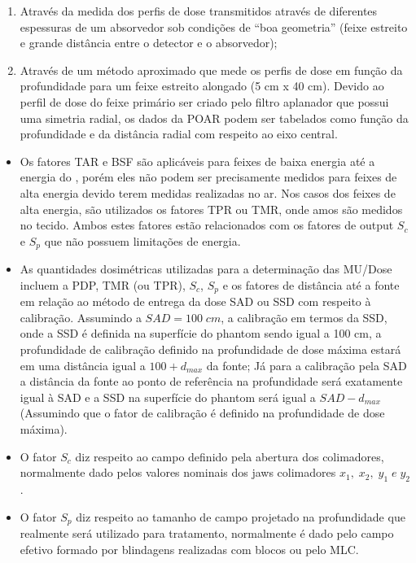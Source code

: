 \documentclass[11pt,a4paper]{article}
\begin{document}
        \begin{enumerate}
            \item Através da medida dos perfis de dose transmitidos através de diferentes espessuras de um absorvedor sob condições de ``boa geometria'' (feixe estreito e grande distância entre o detector e o absorvedor);
            \item Através de um método aproximado que mede os perfis de dose em função da profundidade para um feixe estreito alongado (5 cm x 40 cm). Devido ao perfil de dose do feixe primário ser criado pelo filtro aplanador que possui uma simetria radial, os dados da POAR podem ser tabelados como função da profundidade e da distância radial com respeito ao eixo central.
        \end{enumerate}
    
    \begin{tcolorbox}[width=\textwidth, colback={white}, title={$\bigstar$ \LobsterTwo{Pontos Chave}$\bigstar $}, coltitle={CarnationPink}, colframe={DarkTurquoise}, fonttitle=\LobsterTwo\Large]
    \begin{itemize}[label=\textcolor{CarnationPink}{$\star$}]
        \item Os fatores TAR e BSF são aplicáveis para feixes de baixa energia até a energia do , porém eles não podem ser precisamente medidos para feixes de alta energia devido terem medidas realizadas no ar. Nos casos dos feixes de alta energia, são utilizados os fatores TPR ou TMR, onde amos são medidos no tecido. Ambos estes fatores estão relacionados com os fatores de output $S_c$ e $S_p$ que não possuem limitações de energia.
        \item As quantidades dosimétricas utilizadas para a determinação das MU/Dose incluem a PDP, TMR (ou TPR), $S_c$, $S_p$ e os fatores de distância até a fonte em relação ao método de entrega da dose SAD ou SSD com respeito à calibração. Assumindo a $SAD = 100\;cm$, a calibração em termos da SSD, onde a SSD é definida na superfície do phantom sendo igual a 100 cm, a profundidade de calibração definido na profundidade de dose máxima estará em uma distância igual a $100 + d_{max}$ da fonte; Já para a calibração pela SAD a distância da fonte ao ponto de referência na profundidade será exatamente igual à SAD e  a SSD na superfície do phantom será igual a $SAD-d_{max}$ (Assumindo que o fator de calibração é definido na profundidade de dose máxima).
        \item O fator $S_c$ diz respeito ao campo definido pela abertura dos colimadores, normalmente dado pelos valores nominais dos jaws colimadores $x_1, \; x_2, \; y_1\; e\;  y_2$.
        \item O fator $S_p$ diz respeito ao tamanho de campo projetado na profundidade que realmente será utilizado para tratamento, normalmente é dado pelo campo efetivo formado por blindagens realizadas com blocos ou pelo MLC. 
        

\end{itemize}
\end{tcolorbox}
\end{document}
